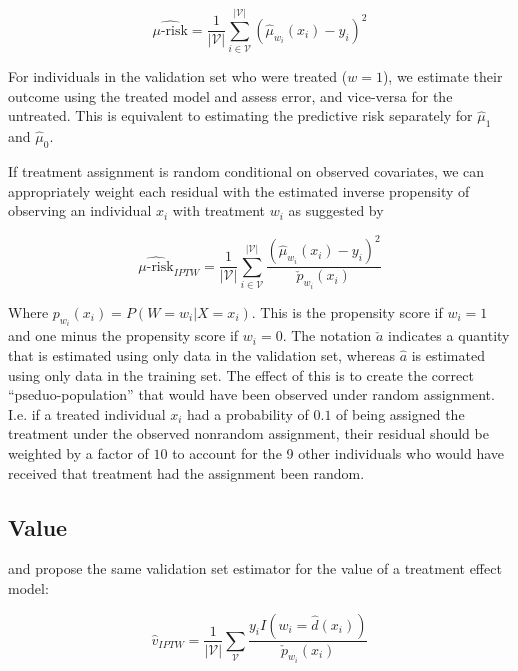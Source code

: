 \begin{equation}
	\widehat{\mu\text{-risk}} = \frac{1}{|\mathcal{V}|} \sum_{i \in \mathcal{V}}^{|\mathcal{V}|}  
	(\hat \mu_{w_i} (x_i) - y_i)^2
\label{murisk}
\end{equation}
 
For individuals in the validation set who were treated ($w=1$), we estimate their outcome using the treated model and assess error, and vice-versa for the untreated. This is equivalent to estimating the predictive risk separately for $\hat\mu_1$ and $\hat\mu_0$. 

If treatment assignment is random conditional on observed covariates, we can appropriately weight each residual with the estimated inverse propensity of observing an individual $x_i$ with treatment $w_i$ as suggested by \citet{VanderLaan:2003ir}

\begin{equation}
	\widehat{\mu\text{-risk}}_{IPTW} = \frac{1}{|\mathcal{V}|} \sum_{i \in \mathcal{V}}^{|\mathcal{V}|}  
	\frac{(\hat \mu_{w_i} (x_i) - y_i)^2}{\check p_{w_i}(x_i)}
\label{murisk-iptw}
\end{equation}

Where $p_{w_i}(x_i) = P(W=w_i | X=x_i)$. This is the propensity score if $w_i = 1$ and one minus the propensity score if $w_i = 0$. The notation $\check a$ indicates a quantity that is estimated using only data in the validation set, whereas $\hat a$ is estimated using only data in the training set. The effect of this is to create the correct ``pseduo-population'' that would have been observed under random assignment. I.e. if a treated individual $x_i$ had a probability of $0.1$ of being assigned the treatment under the observed nonrandom assignment, their residual should be weighted by a factor of $10$ to account for the 9 other individuals who would have received that treatment had the assignment been random.

\subsection{Value}
\label{sec:value}

\citet{Kapelner:3baXYEjR} and \citet{Zhao:2017wa} propose the same validation set estimator for the value of a treatment effect model:

\begin{equation}
\label{value}
\hat v_{IPTW} = \frac{1}{|\mathcal{V}|}\sum_{\mathcal{V}} \frac{y_i I(w_i=\hat d(x_i))}{\check p_{w_i}(x_i)}
\end{equation}

